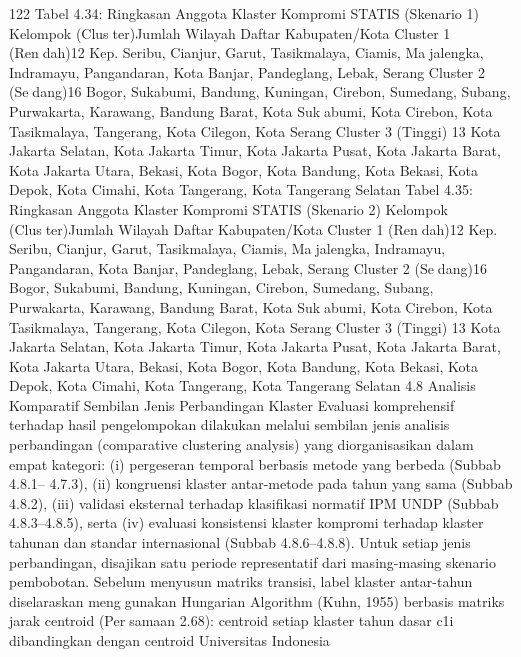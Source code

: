 122
Tabel 4.34: Ringkasan Anggota Klaster Kompromi STATIS (Skenario 1)
Kelompok (Cluster)Jumlah Wilayah Daftar Kabupaten/Kota
Cluster 1 (Rendah)12 Kep. Seribu, Cianjur, Garut, Tasikmalaya, Ciamis, Majalengka, Indramayu, Pangandaran, Kota Banjar, Pandeglang,
Lebak, Serang
Cluster 2 (Sedang)16 Bogor, Sukabumi, Bandung, Kuningan, Cirebon, Sumedang,
Subang, Purwakarta, Karawang, Bandung Barat, Kota Sukabumi, Kota Cirebon, Kota Tasikmalaya, Tangerang, Kota
Cilegon, Kota Serang
Cluster 3 (Tinggi) 13 Kota Jakarta Selatan, Kota Jakarta Timur, Kota Jakarta Pusat,
Kota Jakarta Barat, Kota Jakarta Utara, Bekasi, Kota Bogor,
Kota Bandung, Kota Bekasi, Kota Depok, Kota Cimahi, Kota
Tangerang, Kota Tangerang Selatan
Tabel 4.35: Ringkasan Anggota Klaster Kompromi STATIS (Skenario 2)
Kelompok (Cluster)Jumlah Wilayah Daftar Kabupaten/Kota
Cluster 1 (Rendah)12 Kep. Seribu, Cianjur, Garut, Tasikmalaya, Ciamis, Majalengka, Indramayu, Pangandaran, Kota Banjar, Pandeglang,
Lebak, Serang
Cluster 2 (Sedang)16 Bogor, Sukabumi, Bandung, Kuningan, Cirebon, Sumedang,
Subang, Purwakarta, Karawang, Bandung Barat, Kota Sukabumi, Kota Cirebon, Kota Tasikmalaya, Tangerang, Kota
Cilegon, Kota Serang
Cluster 3 (Tinggi) 13 Kota Jakarta Selatan, Kota Jakarta Timur, Kota Jakarta Pusat,
Kota Jakarta Barat, Kota Jakarta Utara, Bekasi, Kota Bogor,
Kota Bandung, Kota Bekasi, Kota Depok, Kota Cimahi, Kota
Tangerang, Kota Tangerang Selatan
4.8 Analisis Komparatif Sembilan Jenis Perbandingan Klaster
Evaluasi komprehensif terhadap hasil pengelompokan dilakukan melalui sembilan
jenis analisis perbandingan (comparative clustering analysis) yang diorganisasikan dalam
empat kategori: (i) pergeseran temporal berbasis metode yang berbeda (Subbab 4.8.1–
4.7.3), (ii) kongruensi klaster antar-metode pada tahun yang sama (Subbab 4.8.2), (iii)
validasi eksternal terhadap klasifikasi normatif IPM UNDP (Subbab 4.8.3–4.8.5), serta (iv)
evaluasi konsistensi klaster kompromi terhadap klaster tahunan dan standar internasional
(Subbab 4.8.6–4.8.8). Untuk setiap jenis perbandingan, disajikan satu periode representatif
dari masing-masing skenario pembobotan.
Sebelum menyusun matriks transisi, label klaster antar-tahun diselaraskan menggunakan Hungarian Algorithm (Kuhn, 1955) berbasis matriks jarak centroid (Persamaan 2.68): centroid setiap klaster tahun dasar c1i dibandingkan dengan centroid
Universitas Indonesia

